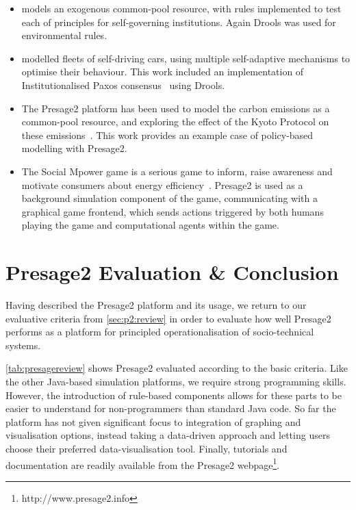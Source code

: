 \begin{itemize}
\item \citet{Schaumeier2013} models an exogenous common-pool resource, with
rules implemented to test each of  principles
for self-governing institutions. Again Drools was used for environmental
rules.

\item \citet{Sanderson2013} modelled fleets of self-driving cars, using
multiple self-adaptive mechanisms to optimise their behaviour. This work
included an implementation of Institutionalised Paxos
consensus~\citep{Sanderson2012} using Drools.

\item The Presage2 platform has been used to model the carbon emissions as a
common-pool resource, and exploring the effect of the Kyoto Protocol on these
emissions~\citep{Macbeth2014}. This work provides an example case of 
policy-based modelling with Presage2.

\item The Social Mpower game is a serious game to inform, raise awareness and motivate
consumers about energy efficiency~\citep{Bourazeri2014}. Presage2 is used as a
background simulation component of the game, communicating with a graphical game
frontend, which sends actions triggered by both humans playing the game and
computational agents within the game.
\end{itemize}

\section{Presage2 Evaluation \& Conclusion}

Having described the Presage2 platform and its usage, we return to our
evaluative criteria from \autoref{sec:p2:review} in order to evaluate how
well Presage2 performs as a platform for principled operationalisation of 
socio-technical systems.

\autoref{tab:presagereview} shows Presage2 evaluated according to the basic
criteria. Like the other Java-based simulation platforms, we require strong
programming skills. However, the introduction of rule-based components allows
for these parts to be easier to understand for non-programmers than standard
Java code. So far the platform has not given significant focus to integration of
graphing and visualisation options, instead taking a data-driven approach and
letting users choose their preferred data-visualisation tool. Finally, tutorials
and documentation are readily available from the Presage2 webpage\footnote{http://www.presage2.info}.

